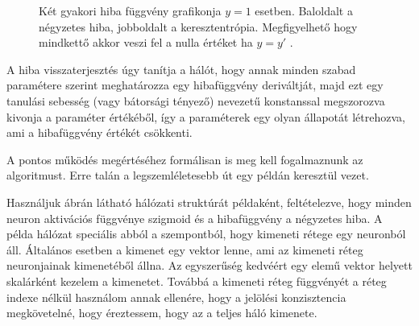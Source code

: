 \begin{figure}[H]
		\begin{subfigure}{\linewidth}
		\end{subfigure}
	\caption{Két gyakori hiba függvény grafikonja $y=1$ esetben. Baloldalt a négyzetes hiba, jobboldalt a keresztentrópia. Megfigyelhető hogy mindkettő akkor veszi fel a nulla értéket ha $y = y'$ \label{loss}.}
\end{figure}
	
A hiba visszaterjesztés úgy tanítja a hálót, hogy annak minden szabad paramétere szerint meghatározza egy hibafüggvény deriváltját, majd ezt egy tanulási sebesség (vagy bátorsági tényező) nevezetű konstanssal megszorozva kivonja a paraméter értékéből, így a paraméterek egy olyan állapotát létrehozva, ami a hibafüggvény értékét csökkenti.

A pontos működés megértéséhez formálisan is meg kell fogalmaznunk az algoritmust. Erre talán a legszemléletesebb út egy példán keresztül vezet.

Használjuk  ábrán látható hálózati struktúrát példaként, feltételezve, hogy minden neuron aktivációs függvénye szigmoid és a hibafüggvény a négyzetes hiba.
A példa hálózat speciális abból a szempontból, hogy kimeneti rétege egy neuronból áll. Általános esetben a kimenet egy vektor lenne, ami az kimeneti réteg neuronjainak kimenetéből állna.  Az egyszerűség kedvéért egy elemű vektor helyett skalárként kezelem a kimenetet. Továbbá a kimeneti réteg függvényét a réteg indexe nélkül használom annak ellenére, hogy a jelölési konzisztencia megkövetelné, hogy éreztessem, hogy az a teljes háló kimenete.


